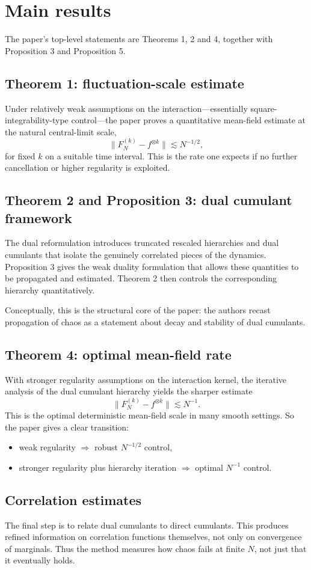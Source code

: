 \documentclass[11pt]{article}
\begin{document}
\section*{Main results}
The paper's top-level statements are Theorems 1, 2 and 4, together with Proposition 3 and Proposition 5.
\subsection*{Theorem 1: fluctuation-scale estimate}
Under relatively weak assumptions on the interaction---essentially square-integrability-type control---the paper proves a quantitative mean-field estimate at the natural central-limit scale,
\[
\|F_N^{(k)} - f^{\otimes k}\| \lesssim N^{-1/2},
\]
for fixed $k$ on a suitable time interval. This is the rate one expects if no further cancellation or higher regularity is exploited.
\subsection*{Theorem 2 and Proposition 3: dual cumulant framework}
The dual reformulation introduces truncated rescaled hierarchies and dual cumulants that isolate the genuinely correlated pieces of the dynamics. Proposition 3 gives the weak duality formulation that allows these quantities to be propagated and estimated. Theorem 2 then controls the corresponding hierarchy quantitatively.

Conceptually, this is the structural core of the paper: the authors recast propagation of chaos as a statement about decay and stability of dual cumulants.
\subsection*{Theorem 4: optimal mean-field rate}
With stronger regularity assumptions on the interaction kernel, the iterative analysis of the dual cumulant hierarchy yields the sharper estimate
\[
\|F_N^{(k)} - f^{\otimes k}\| \lesssim N^{-1}.
\]
This is the optimal deterministic mean-field scale in many smooth settings. So the paper gives a clear transition:
\begin{itemize}[leftmargin=1.5em]
\item weak regularity $\Rightarrow$ robust $N^{-1/2}$ control,
\item stronger regularity plus hierarchy iteration $\Rightarrow$ optimal $N^{-1}$ control.
\end{itemize}
\subsection*{Correlation estimates}
The final step is to relate dual cumulants to direct cumulants. This produces refined information on correlation functions themselves, not only on convergence of marginals. Thus the method measures how chaos fails at finite $N$, not just that it eventually holds.
\end{document}
